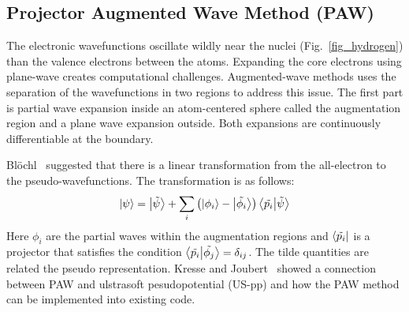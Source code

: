 \subsection{Projector Augmented Wave Method (PAW)}
The electronic wavefunctions oscillate wildly near the nuclei (Fig.~\ref{fig_hydrogen}) than the valence electrons between the atoms. Expanding the core electrons using plane-wave creates computational challenges. Augmented-wave methods uses the separation of the wavefunctions in two regions to address this issue. The first part is partial wave expansion inside an atom-centered sphere called the augmentation region and a plane wave expansion outside. Both expansions are continuously differentiable at the boundary.

Bl\"ochl~\cite{blochl1994projector} suggested that there is a linear transformation from the all-electron to the pseudo-wavefunctions. The transformation is as follows:
\begin{equation}
\ket{\psi} = \ket{\tilde{\psi}} + \sum_i \left(\ket{\phi_i} - \ket{\tilde{\phi_i}}\right)\braket{\tilde{p_i}}{\tilde{\psi}}
\end{equation}
Here $\phi_i$ are the partial waves within the augmentation regions and $\bra{\tilde{p_i}}$ is a projector that satisfies the condition $\braket{\tilde{p_i}}{\tilde{\phi_j}} = \delta_{ij}$. The tilde quantities are related the pseudo representation. Kresse and Joubert~\cite{kresse1999ultrasoft} showed a connection between PAW and ulstrasoft pesudopotential (US-pp) and how the PAW method can be implemented into existing code.

